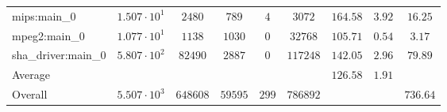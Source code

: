 \begin{tabular}{|l|c|c|c|c|c|c|c|c|}
mips:main\_0            & $ 1.507 \cdot 10^{1}  $ & $ 2480   $ & $ 789   $ & $ 4   $ & $ 3072   $ & $ 164.58      $ & $ 3.92    $ & $ 16.25   $ \\
mpeg2:main\_0           & $ 1.077 \cdot 10^{1}  $ & $ 1138   $ & $ 1030  $ & $ 0   $ & $ 32768  $ & $ 105.71      $ & $ 0.54    $ & $ 3.17    $ \\
sha\_driver:main\_0     & $ 5.807 \cdot 10^{2}  $ & $ 82490  $ & $ 2887  $ & $ 0   $ & $ 117248 $ & $ 142.05      $ & $ 2.96    $ & $ 79.89   $ \\
\hline
Average                 & $                     $ & $        $ & $       $ & $     $ & $        $ & $ 126.58      $ & $ 1.91    $ & $         $ \\
\hline
Overall                 & $ 5.507 \cdot 10^{3}  $ & $ 648608 $ & $ 59595 $ & $ 299 $ & $ 786892 $ & $             $ & $         $ & $ 736.64  $ \\
\hline
\end{tabular}
